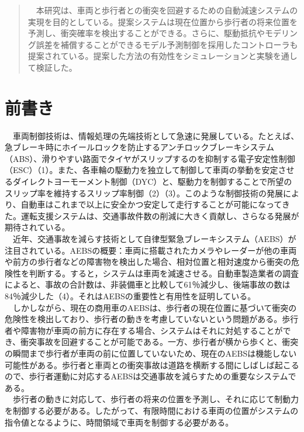 


\begin{abstract}
　本研究は、車両と歩行者との衝突を回避するための自動減速システムの実現を目的としている。提案システムは現在位置から歩行者の将来位置を予測し、衝突確率を検出することができる。さらに、駆動抵抗やモデリング誤差を補償することができるモデル予測制御を採用したコントローラも提案されている。提案した方法の有効性をシミュレーションと実験を通して検証した。
\end{abstract}

\maketitle
\pagestyle{fancy}

\section{前書き}
　車両制御技術は、情報処理の先端技術として急速に発展している。たとえば、急ブレーキ時にホイールロックを防止するアンチロックブレーキシステム（ABS）、滑りやすい路面でタイヤがスリップするのを抑制する電子安定性制御（ESC）（1）。また、各車輪の駆動力を独立して制御して車両の挙動を安定させるダイレクトヨーモーメント制御（DYC）と、駆動力を制御することで所望のスリップ率を維持するスリップ率制御（2）（3）。このような制御技術の発展により、自動車はこれまで以上に安全かつ安定して走行することが可能になってきた。運転支援システムは、交通事故件数の削減に大きく貢献し、さらなる発展が期待されている。\\
　近年、交通事故を減らす技術として自律型緊急ブレーキシステム（AEBS）が注目されている。AEBSの概要：車両に搭載されたカメラやレーダーが他の車両や前方の歩行者などの障害物を検出した場合、相対位置と相対速度から衝突の危険性を判断する。すると，システムは車両を減速させる。自動車製造業者の調査によると、事故の合計数は、非装備車と比較して61％減少し、後端事故の数は84％減少した（4）。それはAEBSの重要性と有用性を証明している。\\
　しかしながら、現在の商用車のAEBSは、歩行者の現在位置に基づいて衝突の危険性を検出しており、歩行者の動きを考慮していないという問題がある。歩行者や障害物が車両の前方に存在する場合、システムはそれに対処することができ、衝突事故を回避することが可能である。一方、歩行者が横から歩くと、衝突の瞬間まで歩行者が車両の前に位置していないため、現在のAEBSは機能しない可能性がある。歩行者と車両との衝突事故は道路を横断する間にしばしば起こるので、歩行者運動に対応するAEBSは交通事故を減らすための重要なシステムである。\\
　歩行者の動きに対応して、歩行者の将来の位置を予測し、それに応じて制動力を制御する必要がある。したがって、有限時間における車両の位置がシステムの指令値となるように、時間領域で車両を制御する必要がある。\\
